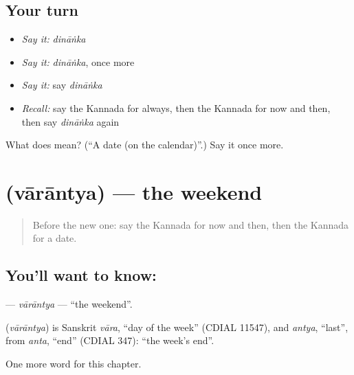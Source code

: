 \subsection*{Your turn}
\begin{itemize}
\raggedright
  \item \emph{Say it:} \emph{dināṅka}
  \item \emph{Say it:} \emph{dināṅka}, once more
  \item \emph{Say it:} say \emph{dināṅka}
  \item \emph{Recall:} say the Kannada for always, then the Kannada for now and then, then say \emph{dināṅka} again
\end{itemize}

\begin{tcolorbox}[breakable,colback=teal!4,colframe=teal!35!black,title={Before you move on}]
What does  mean? (\textquotedblleft{}A date (on the calendar)\textquotedblright{}.) Say it once more.
\end{tcolorbox}
\section[\texorpdfstring{\kn{ವಾರಾಂತ್ಯ} (vārāntya)}{ವಾರಾಂತ್ಯ (vārāntya)}]{ (vārāntya) — the weekend}

\label{lesson:KA-C171-varantya}



\begin{quote}
Before the new one: say the Kannada for now and then, then the Kannada for a date.
\end{quote}

\subsection*{You'll want to know: }
\textbf{} — \emph{vārāntya} — \textquotedblleft{}the weekend\textquotedblright{}.

\begin{cousinweb}
\textbf{} (\emph{vārāntya}) is Sanskrit \emph{vāra}, \textquotedblleft{}day of the week\textquotedblright{} (CDIAL 11547), and \emph{antya}, \textquotedblleft{}last\textquotedblright{}, from \emph{anta}, \textquotedblleft{}end\textquotedblright{} (CDIAL 347): \textquotedblleft{}the week's end\textquotedblright{}.
\end{cousinweb}

\begin{grammarlens}[title={What you've built}]
One more word for this chapter.
\end{grammarlens}


